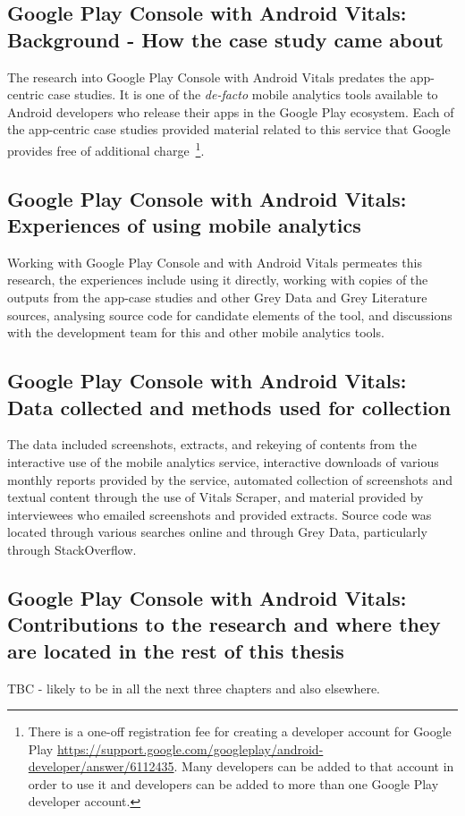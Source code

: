 \subsection{Google Play Console with Android Vitals: Background - How the case study came about}
The research into Google Play Console with Android Vitals predates the app-centric case studies. It is one of the \emph{de-facto} mobile analytics tools available to Android developers who release their apps in the Google Play ecosystem. Each of the app-centric case studies provided material related to this service that Google provides free of additional charge~\footnote{There is a one-off registration fee for creating a developer account for Google Play \url{https://support.google.com/googleplay/android-developer/answer/6112435}. Many developers can be added to that account in order to use it and developers can be added to more than one Google Play developer account.}.

\subsection{Google Play Console with Android Vitals: Experiences of using mobile analytics}
Working with Google Play Console and with Android Vitals permeates this research, the experiences include using it directly, working with copies of the outputs from the app-case studies and other Grey Data and Grey Literature sources, analysing source code for candidate elements of the tool, and discussions with the development team for this and other mobile analytics tools.

\subsection{Google Play Console with Android Vitals: Data collected and methods used for collection}
The data included screenshots, extracts, and rekeying of contents from the interactive use of the mobile analytics service, interactive downloads of various monthly reports provided by the service, automated collection of screenshots and textual content through the use of Vitals Scraper, and material provided by interviewees who emailed screenshots and provided extracts. Source code was located through various searches online and through Grey Data, particularly through StackOverflow. 


\subsection{Google Play Console with Android Vitals: Contributions to the research and where they are located in the rest of this thesis}
TBC - likely to be in all the next three chapters and also elsewhere.


